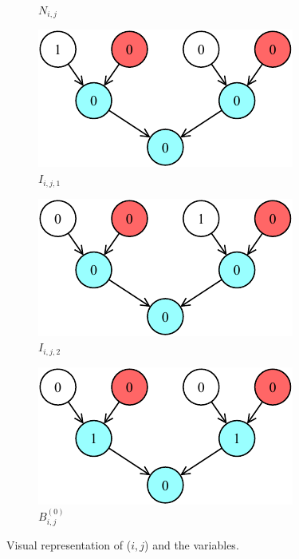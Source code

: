 \documentclass[letterpaper,10pt]{article}
\begin{document}
\begin{figure}[hbtp]
\begin{subfigure}[b]{0.30\textwidth}
        \caption{$N_{i,j}$}
        \label{subfig:ni}
    \end{subfigure}
    \begin{subfigure}[b]{0.30\textwidth}
        \includegraphics[width=\textwidth]{I1.pdf}
        \caption{$I_{i,j,1}$}
        \label{subfig:i1}
    \end{subfigure}
    \hspace{0.01\textwidth}
    \begin{subfigure}[b]{0.30\textwidth}
        \includegraphics[width=\textwidth]{I2.pdf}
        \caption{$I_{i,j,2}$}
        \label{subfig:i2}
    \end{subfigure}
    \hspace{0.01\textwidth}
    \begin{subfigure}[b]{0.30\textwidth}
        \includegraphics[width=\textwidth]{bit.pdf}
        \caption{$B_{i,j}^{(0)}$}
        \label{subfig:bit}
    \end{subfigure}
    \caption{Visual representation of ($i,j$) and the variables.}
    \label{fig:variables}
\end{figure}
\end{document}

